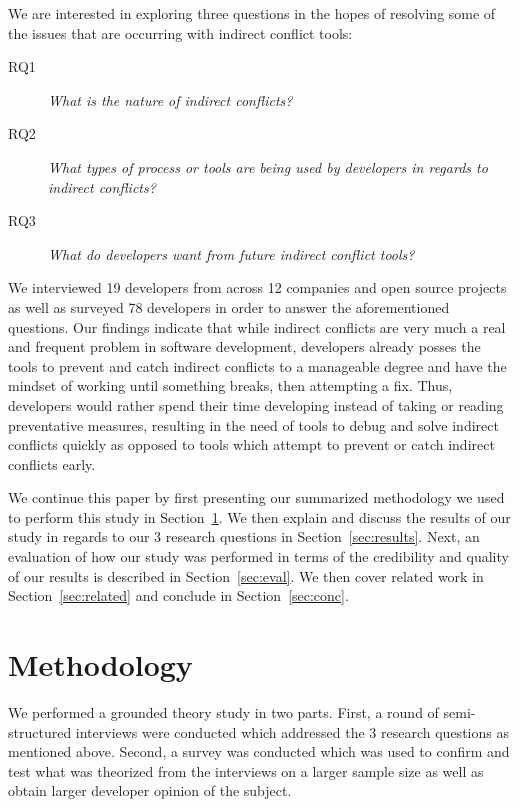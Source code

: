 \documentclass[conference]{IEEEtran}
\makeatletter
\def\namedlabel#1#2{\begingroup
   \def\@currentlabel{#2}%
   \label{#1}\endgroup
}
\makeatother
\begin{document}
We are interested in exploring three questions in the hopes of resolving some of the issues that are occurring
with indirect conflict tools: 

\begin{description}
	\item[RQ1\namedlabel{itm:rq1}{RQ1}] \textit{What is the nature of indirect conflicts?}
	\item[RQ2\namedlabel{itm:rq2}{RQ2}] \textit{What types of process or tools are being used by developers in regards to indirect conflicts?}
	\item[RQ3\namedlabel{itm:rq3}{RQ3}] \textit{What do developers want from future indirect conflict tools?}
\end{description}

We interviewed 19 developers from across 12 companies and open source projects as well as surveyed 78 
developers in order to answer the aforementioned questions. Our findings indicate that while indirect conflicts are very much a real 
and frequent problem
in software development, developers already posses the tools to prevent and catch indirect conflicts to a manageable degree and have
the mindset of working until something breaks, then attempting a fix. Thus, developers would rather spend their time developing instead
of taking or reading preventative measures, resulting in the need of tools to debug and solve indirect conflicts quickly as opposed to tools 
which attempt to prevent or catch indirect conflicts early.

We continue this paper by first presenting our summarized methodology we used to perform this study in Section~\ref{sec:meth}. We
then explain and discuss the results of our study in regards to our 3 research questions in Section~\ref{sec:results}.
Next, an evaluation of how our study was performed in terms of the credibility
and quality of our results is described in Section~\ref{sec:eval}. We then cover related work in Section~\ref{sec:related}
and conclude in Section~\ref{sec:conc}.

\section{Methodology}
\label{sec:meth}

We performed a grounded theory study in two parts. First, a round of semi-structured interviews were conducted which 
addressed the 3 research questions as mentioned above. Second, a survey was conducted
which was used to confirm and test what was theorized from the interviews on a larger sample size as well as obtain
larger developer opinion of the subject.
\end{document}
